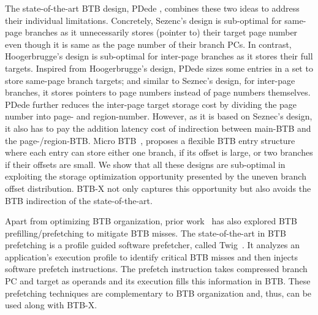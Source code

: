 The state-of-the-art BTB design, PDede \cite{pdede}, combines these two ideas to address their individual limitations. Concretely, Sezenc's design is sub-optimal for same-page branches as it unnecessarily stores (pointer to) their target page number even though it is same as the page number of their branch PCs. In contrast, Hoogerbrugge's design is sub-optimal for inter-page branches as it stores their full targets. Inspired from Hoogerbrugge's design, PDede sizes some entries in a set to store same-page branch targets; and similar to Seznec's design, for inter-page branches, it stores pointers to page numbers instead of page numbers themselves. PDede further reduces the inter-page target storage cost by dividing the page number into page- and region-number. However, as it is based on Seznec's design, it also has to pay the addition latency cost of indirection between main-BTB and the page-/region-BTB. Micro BTB~\cite{microbtb}, proposes a flexible BTB entry structure where each entry can store either one branch, if its offset is large, or two branches if their offsets are small. We show that all these designs are sub-optimal in exploiting the storage optimization opportunity presented by the uneven branch offset distribution. BTB-X not only captures this opportunity but also avoids the BTB indirection of the state-of-the-art.%

Apart from optimizing BTB organization, prior work~\cite{phantom, ibmBTB, twig, boomerang, shotgun} has also explored BTB prefilling/prefetching to mitigate BTB misses. The state-of-the-art in BTB prefetching is a profile guided software prefetcher, called Twig~\cite{twig}. It analyzes an application's execution profile to identify critical BTB misses and then injects software prefetch instructions. The prefetch instruction takes compressed branch PC and target as operands and its execution fills this information in BTB. These prefetching techniques are complementary to BTB organization and, thus, can be used along with BTB-X.


